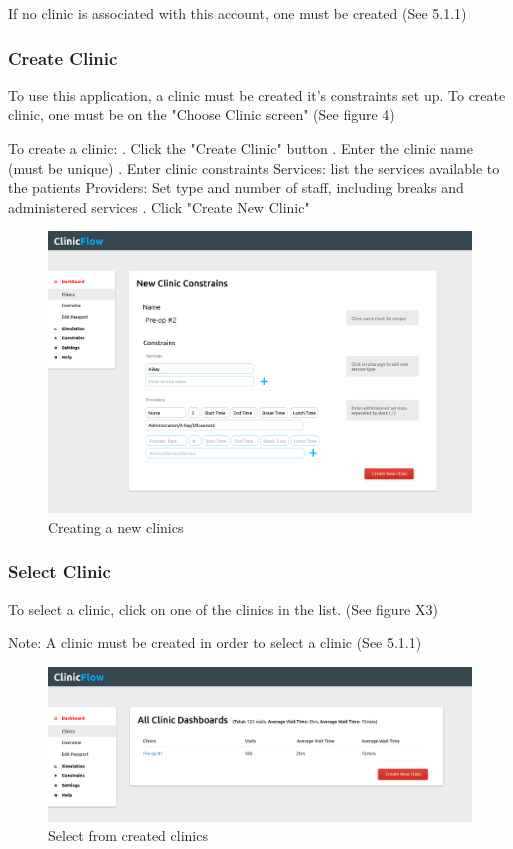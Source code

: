 \documentclass[12pt]{article}
\begin{document}
If no clinic is associated with this account, one must be created (See 5.1.1)

\subsubsection{Create Clinic}
To use this application, a clinic must be created it's constraints set up.
\medbreak
To create clinic, one must be on the "Choose Clinic screen" (See figure 4)
\medbreak

To create a clinic:
. Click the "Create Clinic" button
. Enter the clinic name (must be unique)
. Enter clinic constraints
 Services: list the services available to the patients
 Providers: Set type and number of staff, including breaks and administered services
. Click "Create New Clinic"
\medbreak

\begin{figure}[h]
\caption{Creating a new clinics}
\centering
\includegraphics[width=\textwidth]{newclinic}
\end{figure}

\subsubsection{Select Clinic}
To select a clinic, click on one of the clinics in the list. (See figure X3)
\medbreak

Note: A clinic must be created in order to select a clinic (See 5.1.1)

\begin{figure}[h]
\caption{Select from created clinics}
\centering
\includegraphics[width=\textwidth]{selectclinic}
\end{figure}
\end{document}
